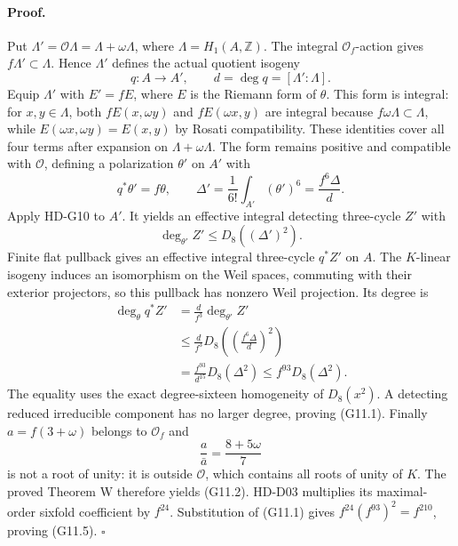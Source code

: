 \paragraph{Proof.}
Put $\Lambda'=\mathcal O\Lambda=\Lambda+\omega\Lambda$, where
$\Lambda=H_1(A,\mathbb Z)$. The integral $\mathcal O_f$-action
gives $f\Lambda'\subset\Lambda$. Hence $\Lambda'$ defines the
actual quotient isogeny
\[
q:A\longrightarrow A',\qquad
d=\deg q=[\Lambda':\Lambda].
\]
Equip $\Lambda'$ with $E'=fE$, where $E$ is the Riemann form
of $\theta$. This form is integral: for $x,y\in\Lambda$, both
$fE(x,\omega y)$ and $fE(\omega x,y)$ are integral because
$f\omega\Lambda\subset\Lambda$, while
$E(\omega x,\omega y)=E(x,y)$ by Rosati compatibility.
These identities cover all four terms after expansion on
$\Lambda+\omega\Lambda$. The form remains positive and compatible
with $\mathcal O$, defining a polarization $\theta'$ on $A'$ with
\[
q^*\theta'=f\theta,\qquad
\Delta'=\frac1{6!}\int_{A'}(\theta')^6
=\frac{f^6\Delta}{d}.
\tag{G11.3}
\]
Apply HD-G10 to $A'$. It yields an effective integral detecting
three-cycle $Z'$ with
\[
\deg_{\theta'}Z'\le D_8((\Delta')^2).
\]
Finite flat pullback gives an effective integral three-cycle
$q^*Z'$ on $A$. The $K$-linear isogeny induces an isomorphism
on the Weil spaces, commuting with their exterior projectors,
so this pullback has nonzero Weil projection. Its degree is
\[
\begin{split}
\deg_\theta q^*Z'
&=\frac d{f^3}\deg_{\theta'}Z'\\
&\le\frac d{f^3}D_8\left(
\left(\frac{f^6\Delta}{d}\right)^2\right)\\
&=\frac{f^{93}}{d^{15}}D_8(\Delta^2)
\le f^{93}D_8(\Delta^2).
\end{split}
\tag{G11.4}
\]
The equality uses the exact degree-sixteen homogeneity of
$D_8(x^2)$. A detecting reduced irreducible component has no larger
degree, proving (G11.1). Finally $a=f(3+\omega)$ belongs to
$\mathcal O_f$ and
\[
\frac a{\bar a}=\frac{8+5\omega}{7}
\]
is not a root of unity: it is outside $\mathcal O$, which contains
all roots of unity of $K$. The proved Theorem W therefore yields
(G11.2). HD-D03 multiplies its maximal-order sixfold coefficient by
$f^{24}$. Substitution of (G11.1) gives
$f^{24}(f^{93})^2=f^{210}$, proving (G11.5).
\hfill$\square$

